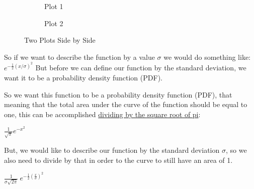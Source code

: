 \documentclass[11pt]{article}
\begin{document}
\begin{figure}
  \centering
  \begin{subfigure}[b]{0.45\textwidth}
    \caption{Plot 1}
    \label{fig:plot1}
  \end{subfigure}
  \hfill
  \begin{subfigure}[b]{0.45\textwidth}
    \caption{Plot 2}
    \label{fig:plot2}
  \end{subfigure}
  \caption{Two Plots Side by Side}
  \label{fig:plots}
\end{figure}

So if we want to describe the function by a value \(\sigma\) we would do
something like: \(e^{-\frac{1}{2}(x/\sigma)^2}\) But before we can
define our function by the standard deviation, we want it to be a
probability density function (PDF).

So we want this function to be a probability density function (PDF),
that meaning that the total area under the curve of the function should
be equal to one, this can be accomplished
\href{https://youtu.be/cy8r7WSuT1I}{dividing by the square root of
pi}:

\begin{center}
  \(\frac{1}{\sqrt\pi} e^{-x^2}\)
\end{center}

But, we would like to describe our function by the standard deviation
\(\sigma\), so we also need to divide by that in order to the curve to
still have an area of 1.

\begin{center}
  \(\frac{1}{\sigma \sqrt{2\pi}} \ e^{-\frac{1}{2} \left (\frac{x}{\sigma} \right)^2}\)
\end{center}
\end{document}
